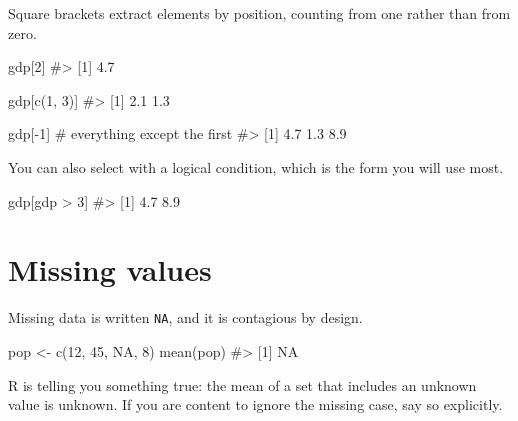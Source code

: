\documentclass[
  a4paper,
]{scrbook}
\newenvironment{Shaded}{\begin{snugshade}}{\end{snugshade}}
\newcommand{\CommentTok}[1]{\textcolor[rgb]{0.37,0.37,0.37}{#1}}
\newcommand{\ConstantTok}[1]{\textcolor[rgb]{0.56,0.35,0.01}{#1}}
\newcommand{\DecValTok}[1]{\textcolor[rgb]{0.68,0.00,0.00}{#1}}
\newcommand{\FunctionTok}[1]{\textcolor[rgb]{0.28,0.35,0.67}{#1}}
\newcommand{\NormalTok}[1]{\textcolor[rgb]{0.00,0.23,0.31}{#1}}
\newcommand{\OtherTok}[1]{\textcolor[rgb]{0.00,0.23,0.31}{#1}}
\newcommand{\SpecialCharTok}[1]{\textcolor[rgb]{0.37,0.37,0.37}{#1}}
\begin{document}

Square brackets extract elements by position, counting from one rather
than from zero.

\begin{Shaded}
\begin{Highlighting}[]
\NormalTok{gdp[}\DecValTok{2}\NormalTok{]}
\CommentTok{\#\textgreater{} [1] 4.7}

\NormalTok{gdp[}\FunctionTok{c}\NormalTok{(}\DecValTok{1}\NormalTok{, }\DecValTok{3}\NormalTok{)]}
\CommentTok{\#\textgreater{} [1] 2.1 1.3}

\NormalTok{gdp[}\SpecialCharTok{{-}}\DecValTok{1}\NormalTok{]        }\CommentTok{\# everything except the first}
\CommentTok{\#\textgreater{} [1] 4.7 1.3 8.9}
\end{Highlighting}
\end{Shaded}

You can also select with a logical condition, which is the form you will
use most.

\begin{Shaded}
\begin{Highlighting}[]
\NormalTok{gdp[gdp }\SpecialCharTok{\textgreater{}} \DecValTok{3}\NormalTok{]}
\CommentTok{\#\textgreater{} [1] 4.7 8.9}
\end{Highlighting}
\end{Shaded}

\section*{Missing values}\label{missing-values}


Missing data is written \texttt{NA}, and it is contagious by design.

\begin{Shaded}
\begin{Highlighting}[]
\NormalTok{pop }\OtherTok{\textless{}{-}} \FunctionTok{c}\NormalTok{(}\DecValTok{12}\NormalTok{, }\DecValTok{45}\NormalTok{, }\ConstantTok{NA}\NormalTok{, }\DecValTok{8}\NormalTok{)}
\FunctionTok{mean}\NormalTok{(pop)}
\CommentTok{\#\textgreater{} [1] NA}
\end{Highlighting}
\end{Shaded}

R is telling you something true: the mean of a set that includes an
unknown value is unknown. If you are content to ignore the missing case,
say so explicitly.
\end{document}
